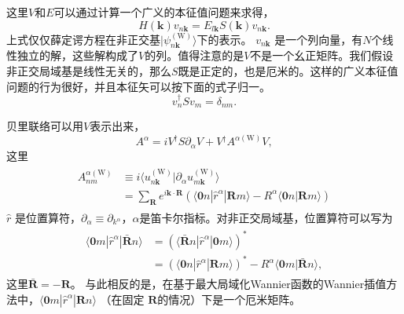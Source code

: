 这里$V$和$E$可以通过计算一个广义的本征值问题来求得，
\begin{equation}
H(\boldsymbol{k})v_{n\boldsymbol{k}}=E_{l\boldsymbol{k}}S(\boldsymbol{k})v_{n\boldsymbol{k}}.\label{eq:gep}
\end{equation}
上式仅仅薛定谔方程在非正交基$|\psi_{n\boldsymbol{k}}^{(\text{W})}\rangle$下的表示。 $v_{n\boldsymbol{k}}$ 是一个列向量，有$N$个线性独立的解，这些解构成了$V$的列。值得注意的是$V$不是一个幺正矩阵。我们假设非正交局域基是线性无关的，那么$S$既是正定的，也是厄米的。这样的广义本征值问题的行为很好，并且本征矢可以按下面的式子归一。
\begin{equation}
v_{n}^{\dagger}Sv_{m}=\delta_{nm}.\label{eq:norm}
\end{equation}

贝里联络可以用$V$表示出来，
\begin{equation}
A^{\alpha}=iV^{\dagger}S\partial_{\alpha}V+V{}^{\dagger}A^{\alpha(\text{W})}V,\label{eq:A}
\end{equation}
这里
\begin{align}
\begin{split}
A_{nm}^{\alpha(\text{W})} & \equiv i\langle u_{n\boldsymbol{k}}^{(\text{W})}|\partial_{\alpha}u_{m\boldsymbol{k}}^{(\text{W})}\rangle\\
& =\sum_{\boldsymbol{R}}e^{i\boldsymbol{k}\cdot\boldsymbol{R}}(\langle\boldsymbol{0}n|\hat{r}^{\alpha}|\boldsymbol{R}m\rangle-R^{\alpha}\langle\boldsymbol{0}n|\boldsymbol{R}m\rangle)
\end{split}
\end{align}
$\hat{r}$ 是位置算符，$\partial_{\alpha}\equiv\partial_{k^{\alpha}}$，$\alpha$是笛卡尔指标。对非正交局域基，位置算符可以写为
\begin{align}
\begin{split}
\langle\boldsymbol{0}m|\hat{r}^{\alpha}|\bar{\boldsymbol{R}}n\rangle & =(\langle\bar{\boldsymbol{R}}n|\hat{r}^{\alpha}|\boldsymbol{0}m\rangle)^{*}\\
& =(\langle\boldsymbol{0}n|\hat{r}^{\alpha}|\boldsymbol{R}m\rangle)^{*}-R^{\alpha}\langle\boldsymbol{0}m|\bar{\boldsymbol{R}}n\rangle,
\end{split}
\end{align}
这里$\bar{\boldsymbol{R}}=-\boldsymbol{R}$。
与此相反的是，在基于最大局域化Wannier函数的Wannier插值方法中，$\langle\boldsymbol{0}m|\hat{r}^{\alpha}|\boldsymbol{R}n\rangle$ （在固定 $\boldsymbol{R}$的情况）下是一个厄米矩阵。 

